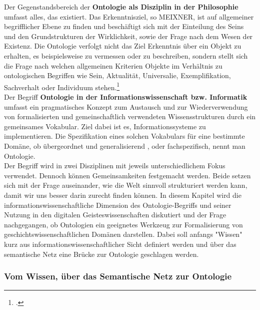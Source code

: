 \documentclass[12pt,a4paper]{article}
\begin{document}
Der Gegenstandsbereich der \textbf{Ontologie als Disziplin in der Philosophie} umfasst alles, das existiert. Das Erkenntnisziel, so MEIXNER, ist auf allgemeiner begrifflicher Ebene zu finden und beschäftigt sich mit der Einteilung des Seins und den Grundstrukturen der Wirklichkeit, sowie der Frage nach dem Wesen der Existenz. Die Ontologie verfolgt nicht das Ziel Erkenntnis über ein Objekt zu erhalten, es beispielsweise zu vermessen oder zu beschreiben, sondern stellt sich die Frage nach welchen allgemeinen Kriterien Objekte im Verhältnis zu ontologischen Begriffen wie Sein, Aktualität, Universalie, Exemplifikation, Sachverhalt oder Individuum stehen.\footcite{meixner1994wissenschaft}
\\
Der Begriff \textbf{Ontologie in der Informationswissenschaft bzw. Informatik} umfasst ein pragmatisches Konzept zum Austausch und zur Wiederverwendung von formalisierten und gemeinschaftlich verwendeten Wissensstrukturen durch ein gemeinsames Vokabular. Ziel dabei ist es, Informationssysteme zu implementieren. Die Spezifikation eines solchen Vokabulars für eine bestimmte Domäne, ob übergeordnet und generalisierend , oder fachspezifisch, nennt man Ontologie.
\\
Der Begriff wird in zwei Disziplinen mit jeweils unterschiedlichem Fokus verwendet. Dennoch können Gemeinsamkeiten festgemacht werden. Beide setzen sich mit der Frage auseinander, wie die Welt sinnvoll strukturiert werden kann, damit wir uns besser darin zurecht finden können. In diesem Kapitel wird die informationswissenschaftliche Dimension des Ontologie-Begriffs und seiner Nutzung in den digitalen Geisteswissenschaften diskutiert und der Frage nachgegangen, ob Ontologien ein geeignetes Werkzeug zur Formalisierung von geschichtswissenschaftlichen Domänen darstellen. Dabei soll anfangs "Wissen" kurz aus informationswissenschaftlicher Sicht definiert werden und über das semantische Netz eine Brücke zur Ontologie geschlagen werden. 

\subsubsection{Vom Wissen, über das Semantische Netz zur Ontologie}
\end{document}
